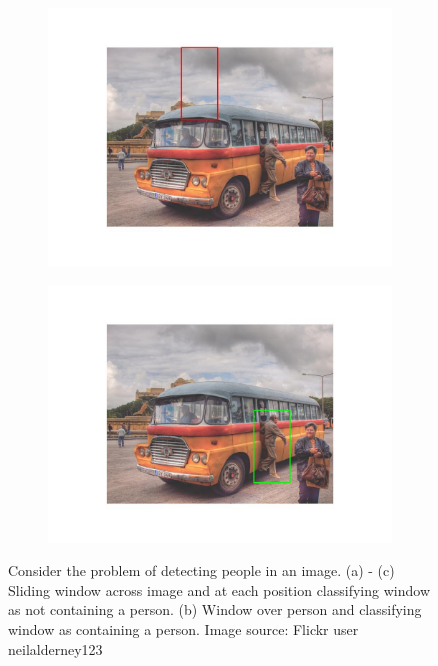 \documentclass{article}
\begin{document}
\begin{figure}[h]
\begin{subfigure}{0.48\textwidth}
    \includegraphics[width=\linewidth]{sliding_window_c.jpg}
    \caption{}
  \end{subfigure}
  \hspace*{\fill} %
  \begin{subfigure}{0.48\textwidth}
    \includegraphics[width=\linewidth]{sliding_window_d.jpg}
    \caption{}
  \end{subfigure}
  \caption{Consider the problem of detecting people in an image. (a) - (c) Sliding window across image and at each position classifying window as not containing a person. (b) Window over person and classifying window as containing a person. Image source: Flickr user neilalderney123}
\end{figure}
\end{document}
